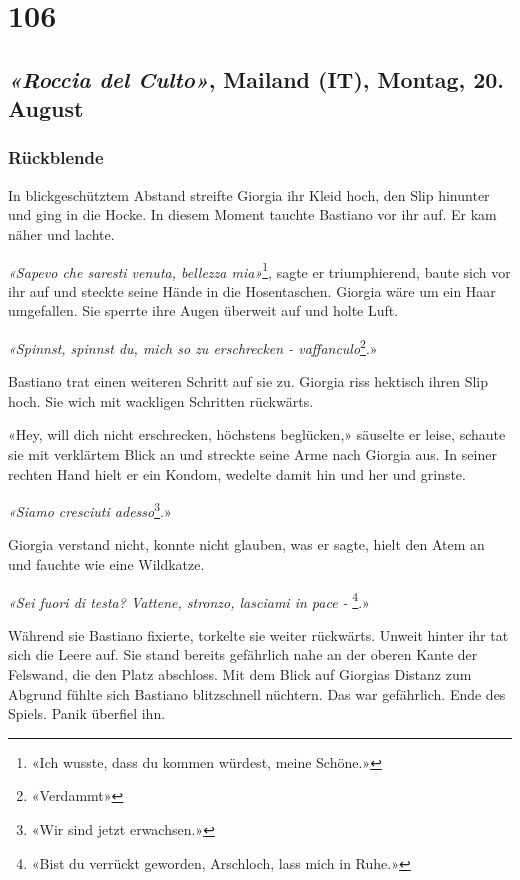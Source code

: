 \chapter{106}

\section[«Roccia del Culto», Mailand (IT), Montag, 20. August]{\emph{«Roccia del Culto»}, Mailand (IT), Montag, 20. August}

\subsection{Rückblende}

In blickgeschütztem Abstand streifte Giorgia ihr Kleid hoch, den Slip
hinunter und ging in die Hocke. In diesem Moment tauchte Bastiano vor
ihr auf. Er kam näher und lachte.

\emph{«Sapevo che saresti venuta, bellezza mia»}\footnote{«Ich wusste, dass du kommen würdest, meine Schöne.»}, sagte er
triumphierend, baute sich vor ihr auf und steckte seine Hände in die
Hosentaschen.
Giorgia wäre um ein Haar umgefallen. Sie sperrte ihre Augen überweit auf
und holte Luft.

\emph{«Spinnst, spinnst du, mich so zu erschrecken - vaffanculo}\footnote{«Verdammt»}.»

Bastiano trat einen weiteren Schritt auf sie zu. Giorgia riss hektisch
ihren Slip hoch. Sie wich mit wackligen Schritten rückwärts.

«Hey, will dich nicht erschrecken, höchstens beglücken,» säuselte er
leise, schaute sie mit verklärtem Blick an und streckte seine Arme nach
Giorgia aus.
In seiner rechten Hand hielt er ein Kondom, wedelte damit hin und her und
grinste.

\emph{«Siamo cresciuti adesso}\footnote{«Wir sind jetzt erwachsen.»}.»

Giorgia verstand nicht, konnte nicht glauben, was er sagte, hielt den
Atem an und fauchte wie eine Wildkatze.

\emph{«Sei fuori di testa? Vattene, stronzo, lasciami in pace - }\footnote{«Bist du verrückt geworden, Arschloch, lass mich in Ruhe.»}.»

Während sie Bastiano fixierte, torkelte sie weiter rückwärts.
Unweit hinter ihr tat sich die Leere auf. Sie stand bereits gefährlich
nahe an der oberen Kante der Felswand, die den Platz abschloss. Mit dem
Blick auf Giorgias Distanz zum Abgrund fühlte sich Bastiano blitzschnell
nüchtern. Das war gefährlich. Ende des Spiels.
Panik überfiel ihn.

